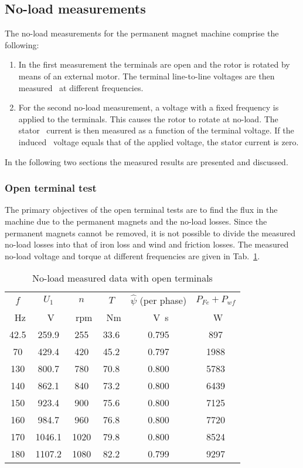 \subsection{No-load measurements}
The no-load measurements for the permanent magnet machine comprise the following:
\begin{enumerate}
	\item In the first measurement the terminals are open and the rotor is rotated by~%
	means of an external motor. The terminal line-to-line voltages are then measured~%
	at different frequencies.  
	\item For the second no-load measurement, a voltage with a fixed frequency is~%
	applied to the terminals. This causes the rotor to rotate at no-load. The stator~%
	current is then measured as a function of the terminal voltage. If the induced~%
	voltage equals that of the applied voltage, the stator current is zero. 
\end{enumerate}
In the following two sections the measured results are presented and discussed.
 
\subsubsection{Open terminal test}
The primary objectives of the open terminal tests are to find the flux in the machine due to the permanent magnets and the no-load losses. Since the permanent magnets cannot be removed, it is not possible to divide the measured no-load losses into that of iron loss and wind and friction losses. The measured no-load voltage and torque at different frequencies are given in Tab.~\ref{tab:NoLoadWithOpenTerminals}. 
\begin{table}[htbp]
	\centering
	\caption{No-load measured data with open terminals}
	\begin{tabular}{cccccc}
			\toprule
			$f$                      &%
			$U_1$                    &%
			$n$                      &%
			$T$                      &%
			$\hat{\psi}$ (per phase) &%
			$P_{Fe}+P_{wf}$%
			\\
			\SI{}{Hz}    &%
			\SI{}{V}     &%
			\SI{}{rpm}   &%
			\SI{}{Nm}    &%
			\SI{}{V.s}   &%
			\SI{}{W}%
			\\
			\midrule
			42.5 & 259.9 & 255    & 33.6 & 0.795  & 897\\
			70   & 429.4 & 420    & 45.2 & 0.797  & 1988\\  
			130  & 800.7 & 780    & 70.8 & 0.800  & 5783\\
			140  &862.1  & 840    & 73.2 & 0.800  & 6439\\
			150  &923.4  & 900    & 75.6 & 0.800  & 7125\\
			160  &984.7  & 960    & 76.8 & 0.800  & 7720\\
			170  &1046.1 & 1020   & 79.8 & 0.800  & 8524\\
			180  &1107.2 & 1080   & 82.2 & 0.799  & 9297\\
		\bottomrule
		\end{tabular}
	\label{tab:NoLoadWithOpenTerminals}
\end{table}

